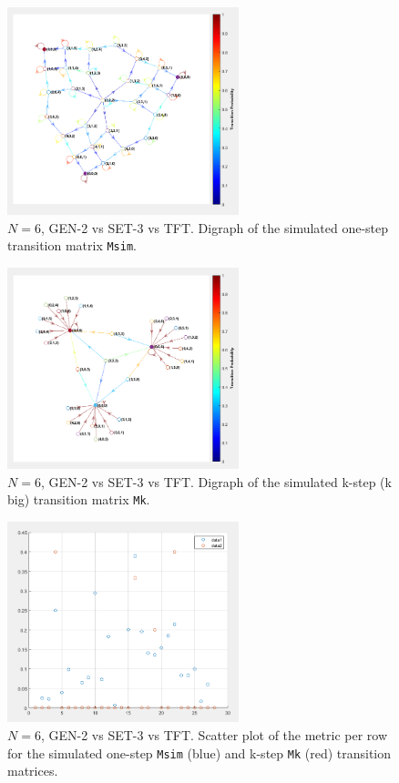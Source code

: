 \documentclass[12pt]{report}
\begin{document}
\begin{figure}[h!]
    \centering
    \includegraphics[width=0.6\textwidth]{A8-MsimDigraph.png}
    \caption{$N=6$, GEN-2 vs SET-3 vs TFT. Digraph of the simulated one-step transition matrix \texttt{Msim}.}
    \label{A8}
\end{figure}

\begin{figure}[h!]
    \centering
    \includegraphics[width=0.6\textwidth]{A9-MsimkDigraph.png}
    \caption{$N=6$, GEN-2 vs SET-3 vs TFT. Digraph of the simulated k-step (k big) transition matrix \texttt{Mk}.}
    \label{A9}
\end{figure}

\begin{figure}[h!]
    \centering
    \includegraphics[width=0.6\textwidth]{A12-MetricDifferences.png}
    \caption{$N=6$, GEN-2 vs SET-3 vs TFT. Scatter plot of the metric per row for the simulated one-step \texttt{Msim} (blue) and k-step \texttt{Mk} (red) transition matrices.}
    \label{A12}
\end{figure}
\end{document}
